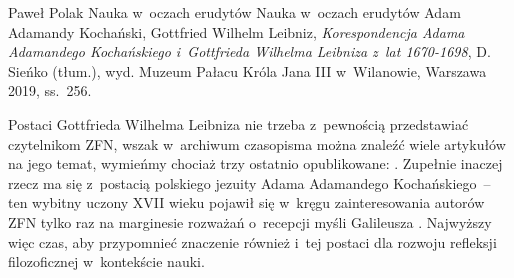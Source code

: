 \begin{recplenv}{Paweł Polak}
	{Nauka w~oczach erudytów}
	{Nauka w~oczach erudytów}
	{Adam Adamandy Kochański, Gottfried Wilhelm Leibniz, \textit{Korespondencja Adama Adamandego Kochańskiego i~Gottfrieda Wilhelma Leibniza z~lat 1670-1698}, D. Sieńko (tłum.), wyd. Muzeum Pałacu Króla Jana III w~Wilanowie, Warszawa 2019, ss.~256.}
	

Postaci Gottfrieda Wilhelma Leibniza nie trzeba z~pewnością przedstawiać czytelnikom ZFN, wszak w~archiwum czasopisma
można znaleźć wiele artykułów na jego temat, wymieńmy chociaż trzy ostatnio opublikowane:
\parencite{heller_wyzwanie_2016,bubula_woluntaryzm_2011,heller_stworzenie_2008}.
Zupełnie inaczej rzecz ma się z~postacią polskiego jezuity Adama
Adamandego Kochańskiego~-- ten wybitny uczony XVII wieku pojawił się w~kręgu zainteresowania autorów ZFN tylko raz na
marginesie rozważań o~recepcji myśli Galileusza
\parencite{targosz_polski_2003}.
Najwyższy więc czas, aby
przypomnieć znaczenie również i~tej postaci dla rozwoju refleksji filozoficznej w~kontekście nauki.

\enlargethispage{.5\baselineskip}


\end{recplenv}
